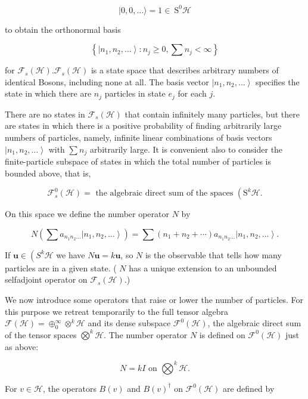 \documentclass[10pt, letterpaper]{article}
\begin{document}
$$
|0,0, \ldots\rangle=1 \in \mathrm{~S}^{0} \mathcal{H}
$$

to obtain the orthonormal basis

$$
\left\{\left|n_{1}, n_{2}, \ldots\right\rangle: n_{j} \geq 0, \sum n_{j}<\infty\right\}
$$

for $\mathcal{F}_{s}(\mathcal{H}) . \mathcal{F}_{s}(\mathcal{H})$ is a state space that describes arbitrary numbers of identical Bosons, including none at all. The basis vector $\left|n_{1}, n_{2}, \ldots\right\rangle$ specifies the state in which there are $n_{j}$ particles in state $e_{j}$ for each $j$.

There are no states in $\mathcal{F}_{s}(\mathcal{H})$ that contain infinitely many particles, but there are states in which there is a positive probability of finding arbitrarily large numbers of particles, namely, infinite linear combinations of basis vectors $\left|n_{1}, n_{2}, \ldots\right\rangle$ with $\sum n_{j}$ arbitrarily large. It is convenient also to consider the finite-particle subspace of states in which the total number of particles is bounded above, that is,

$$
\mathcal{F}_{s}^{0}(\mathcal{H})=\text { the algebraic direct sum of the spaces }\left(\mathrm{S}^{k} \mathcal{H} .\right.
$$

On this space we define the number operator $N$ by

$$
N\left(\sum a_{n_{1} n_{2} \ldots}\left|n_{1}, n_{2}, \ldots\right\rangle\right)=\sum\left(n_{1}+n_{2}+\cdots\right) a_{n_{1} n_{2} \ldots}\left|n_{1}, n_{2}, \ldots\right\rangle .
$$

If $\mathbf{u} \in\left(S^{k} \mathcal{H}\right.$ we have $N \mathbf{u}=k \mathbf{u}$, so $N$ is the observable that tells how many particles are in a given state. ( $N$ has a unique extension to an unbounded selfadjoint operator on $\mathcal{F}_{s}(\mathcal{H})$.)

We now introduce some operators that raise or lower the number of particles. For this purpose we retreat temporarily to the full tensor algebra $\mathcal{F}(\mathcal{H})= \oplus_{0}^{\infty} \otimes^{k} \mathcal{H}$ and its dense subspace $\mathcal{F}^{0}(\mathcal{H})$, the algebraic direct sum of the tensor spaces $\bigotimes^{k} \mathcal{H}$. The number operator $N$ is defined on $\mathcal{F}^{0}(\mathcal{H})$ just as above:

$$
N=k I \text { on } \bigotimes^{k} \mathcal{H} .
$$

For $v \in \mathcal{H}$, the operators $B(v)$ and $B(v)^{\dagger}$ on $\mathcal{F}^{0}(\mathcal{H})$ are defined by
\end{document}
